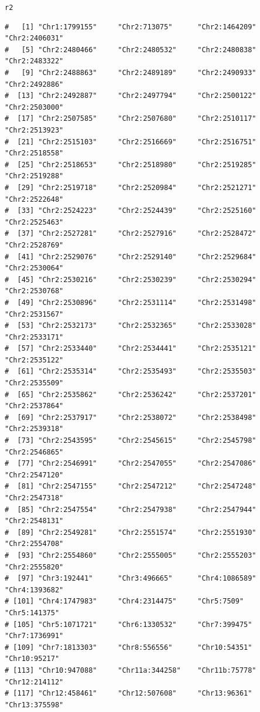 \documentclass{article}\usepackage[]{graphicx}\usepackage[]{color}
\makeatletter
\newcommand{\hlstd}[1]{\textcolor[rgb]{0.345,0.345,0.345}{#1}}%
\newenvironment{kframe}{%
 \def\at@end@of@kframe{}%
 \ifinner\ifhmode%
  \def\at@end@of@kframe{\end{minipage}}%
  \begin{minipage}{\columnwidth}%
 \fi\fi%
 \def\FrameCommand##1{\hskip\@totalleftmargin \hskip-\fboxsep
 \colorbox{shadecolor}{##1}\hskip-\fboxsep
     \hskip-\linewidth \hskip-\@totalleftmargin \hskip\columnwidth}%
 \MakeFramed {\advance\hsize-\width
   \@totalleftmargin\z@ \linewidth\hsize
   \@setminipage}}%
 {\par\unskip\endMakeFramed%
 \at@end@of@kframe}
\newenvironment{knitrout}{}{} %
\makeatother
\begin{document}
\begin{knitrout}
\begin{kframe}
\begin{alltt}
\hlstd{r2}
\end{alltt}
\begin{verbatim}
#   [1] "Chr1:1799155"     "Chr2:713075"      "Chr2:1464209"     "Chr2:2406031"    
#   [5] "Chr2:2480466"     "Chr2:2480532"     "Chr2:2480838"     "Chr2:2483322"    
#   [9] "Chr2:2488863"     "Chr2:2489189"     "Chr2:2490933"     "Chr2:2492886"    
#  [13] "Chr2:2492887"     "Chr2:2497794"     "Chr2:2500122"     "Chr2:2503000"    
#  [17] "Chr2:2507585"     "Chr2:2507680"     "Chr2:2510117"     "Chr2:2513923"    
#  [21] "Chr2:2515103"     "Chr2:2516669"     "Chr2:2516751"     "Chr2:2518558"    
#  [25] "Chr2:2518653"     "Chr2:2518980"     "Chr2:2519285"     "Chr2:2519288"    
#  [29] "Chr2:2519718"     "Chr2:2520984"     "Chr2:2521271"     "Chr2:2522648"    
#  [33] "Chr2:2524223"     "Chr2:2524439"     "Chr2:2525160"     "Chr2:2525463"    
#  [37] "Chr2:2527281"     "Chr2:2527916"     "Chr2:2528472"     "Chr2:2528769"    
#  [41] "Chr2:2529076"     "Chr2:2529140"     "Chr2:2529684"     "Chr2:2530064"    
#  [45] "Chr2:2530216"     "Chr2:2530239"     "Chr2:2530294"     "Chr2:2530768"    
#  [49] "Chr2:2530896"     "Chr2:2531114"     "Chr2:2531498"     "Chr2:2531567"    
#  [53] "Chr2:2532173"     "Chr2:2532365"     "Chr2:2533028"     "Chr2:2533171"    
#  [57] "Chr2:2533440"     "Chr2:2534441"     "Chr2:2535121"     "Chr2:2535122"    
#  [61] "Chr2:2535314"     "Chr2:2535493"     "Chr2:2535503"     "Chr2:2535509"    
#  [65] "Chr2:2535862"     "Chr2:2536242"     "Chr2:2537201"     "Chr2:2537864"    
#  [69] "Chr2:2537917"     "Chr2:2538072"     "Chr2:2538498"     "Chr2:2539318"    
#  [73] "Chr2:2543595"     "Chr2:2545615"     "Chr2:2545798"     "Chr2:2546865"    
#  [77] "Chr2:2546991"     "Chr2:2547055"     "Chr2:2547086"     "Chr2:2547120"    
#  [81] "Chr2:2547155"     "Chr2:2547212"     "Chr2:2547248"     "Chr2:2547318"    
#  [85] "Chr2:2547554"     "Chr2:2547938"     "Chr2:2547944"     "Chr2:2548131"    
#  [89] "Chr2:2549281"     "Chr2:2551574"     "Chr2:2551930"     "Chr2:2554708"    
#  [93] "Chr2:2554860"     "Chr2:2555005"     "Chr2:2555203"     "Chr2:2555820"    
#  [97] "Chr3:192441"      "Chr3:496665"      "Chr4:1086589"     "Chr4:1393682"    
# [101] "Chr4:1747983"     "Chr4:2314475"     "Chr5:7509"        "Chr5:141375"     
# [105] "Chr5:1071721"     "Chr6:1330532"     "Chr7:399475"      "Chr7:1736991"    
# [109] "Chr7:1813303"     "Chr8:556556"      "Chr10:54351"      "Chr10:95217"     
# [113] "Chr10:947088"     "Chr11a:344258"    "Chr11b:75778"     "Chr12:214112"    
# [117] "Chr12:458461"     "Chr12:507608"     "Chr13:96361"      "Chr13:375598"    

\end{verbatim}
\end{kframe}
\end{knitrout}
\end{document}
